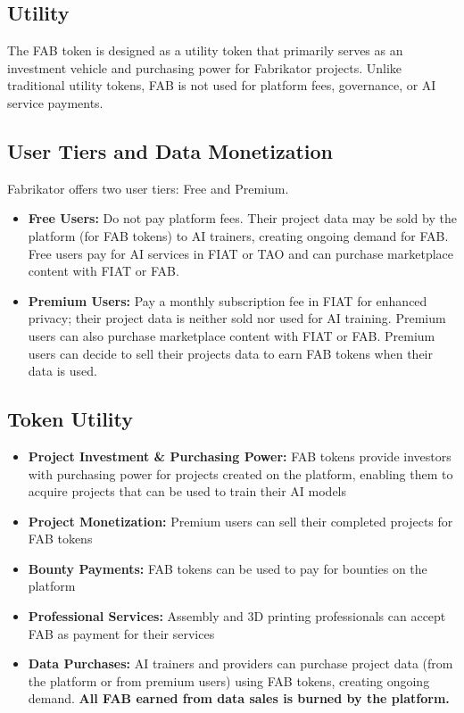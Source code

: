 \subsection*{Utility}

The FAB token is designed as a utility token that primarily serves as an investment vehicle and purchasing power for Fabrikator projects. Unlike traditional utility tokens, FAB is not used for platform fees, governance, or AI service payments.

\subsection*{User Tiers and Data Monetization}

Fabrikator offers two user tiers: Free and Premium.

\begin{itemize}[leftmargin=*]
    \item \textbf{Free Users:} Do not pay platform fees. Their project data may be sold by the platform (for FAB tokens) to AI trainers, creating ongoing demand for FAB. Free users pay for AI services in FIAT or TAO and can purchase marketplace content with FIAT or FAB.
    \item \textbf{Premium Users:} Pay a monthly subscription fee in FIAT for enhanced privacy; their project data is neither sold nor used for AI training. Premium users can also purchase marketplace content with FIAT or FAB. Premium users can decide to sell their projects data to earn FAB tokens when their data is used.
\end{itemize}

\subsection*{Token Utility}
\begin{itemize}[leftmargin=*]
    \item \textbf{Project Investment \& Purchasing Power:} FAB tokens provide investors with purchasing power for projects created on the platform, enabling them to acquire projects that can be used to train their AI models
    \item \textbf{Project Monetization:} Premium users can sell their completed projects for FAB tokens
    \item \textbf{Bounty Payments:} FAB tokens can be used to pay for bounties on the platform
    \item \textbf{Professional Services:} Assembly and 3D printing professionals can accept FAB as payment for their services
    \item \textbf{Data Purchases:} AI trainers and providers can purchase project data (from the platform or from premium users) using FAB tokens, creating ongoing demand. \textbf{All FAB earned from data sales is burned by the platform.}
\end{itemize}

